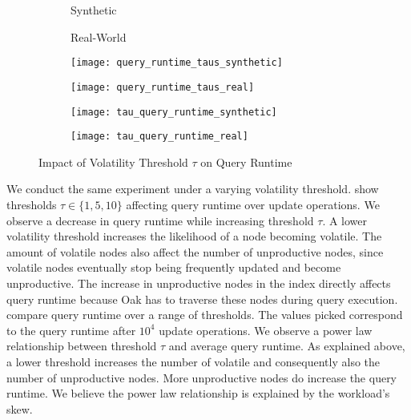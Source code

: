 \documentclass[abstracton,12pt]{scrartcl}
\theoremstyle{definition}
\begin{document}
\begin{figure}[H]
  \centering
  \begin{subfigure}{0.49\linewidth}
    \centering
    Synthetic
  \end{subfigure}
  \begin{subfigure}{0.49\linewidth}
    \centering
    Real-World
  \end{subfigure}
  \begin{subfigure}{0.49\linewidth}
    \centering
    \texttt{[image: query\_runtime\_taus\_synthetic]}
    \caption{}
    \label{fig:query_runtime_taus_synthetic}
  \end{subfigure}
  \begin{subfigure}{0.49\linewidth}
    \centering
    \texttt{[image: query\_runtime\_taus\_real]}
    \caption{}
    \label{fig:query_runtime_taus_real}
  \end{subfigure}
  \begin{subfigure}{0.49\linewidth}
    \centering
    \texttt{[image: tau\_query\_runtime\_synthetic]}
    \caption{}
    \label{fig:tau_query_runtime_synthetic}
  \end{subfigure}
  \begin{subfigure}{0.49\linewidth}
    \centering
    \texttt{[image: tau\_query\_runtime\_real]}
    \caption{}
    \label{fig:tau_query_runtime_real}
  \end{subfigure}
\caption{Impact of Volatility Threshold $\tau$ on Query Runtime}
\end{figure}

We conduct the same experiment under a varying volatility threshold. 
 show
thresholds $\tau \in \{1,5,10\}$ affecting query runtime
over update operations. We observe a decrease in query runtime
while increasing threshold $\tau$.
A lower volatility threshold increases the likelihood of a node
becoming volatile. The amount of volatile nodes also affect the number of
unproductive nodes, since volatile nodes eventually stop being frequently
updated and become unproductive. The increase in unproductive nodes in the index
directly affects query runtime because Oak has to traverse these nodes during
query execution.
 compare query
runtime over a range of thresholds. The values picked correspond to
the query runtime after $10^4$ update operations.
We observe a power law relationship between threshold $\tau$ and average query
runtime. As explained above, a lower threshold increases the number of volatile
and consequently also the number of unproductive nodes. More unproductive nodes
do increase the query runtime. We believe the power law relationship is
explained by the workload's skew. 
\end{document}
